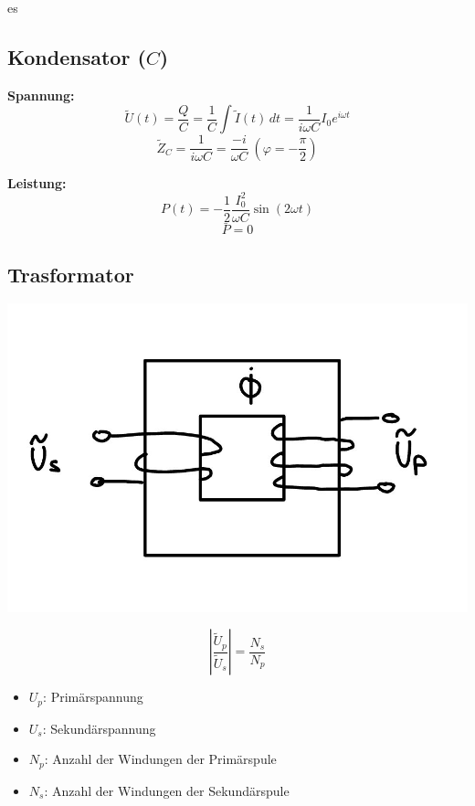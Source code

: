 es\documentclass[a4paper, fontsize=8pt, landscape]{scrartcl}
\begin{document}
\begin{multicols*}{4}
\subsection{Kondensator ($C$)}

\textbf{Spannung:}
\[
\tilde{U}(t) = \frac{Q}{C} = \frac{1}{C} \int \tilde{I}(t) \, dt = \frac{1}{i\omega C} I_0 e^{i\omega t}
\]
\[
\tilde{Z}_C = \frac{1}{i\omega C} = \frac{-i}{\omega C} \ (\varphi = -\frac{\pi}{2})
\]

\textbf{Leistung:}
\[
P(t) = -\frac{1}{2} \frac{I_0^2}{\omega C} \sin(2\omega t)
\]
\[
\bar{P} = 0
\]

\subsection{Trasformator}
\begin{center}
    \includegraphics[scale=0.1]{Images/transformator.jpg}
\end{center}
\[
|\frac{\tilde{U}_p}{\tilde{U}_s}| = \frac{N_s}{N_p}
\]

\begin{itemize}
    \item \( U_p \): Primärspannung\\
    \item \( U_s \): Sekundärspannung\\
    \item \( N_p \): Anzahl der Windungen der Primärspule\\
    \item \( N_s \): Anzahl der Windungen der Sekundärspule
\end{itemize}








\end{multicols*}
\end{document}
